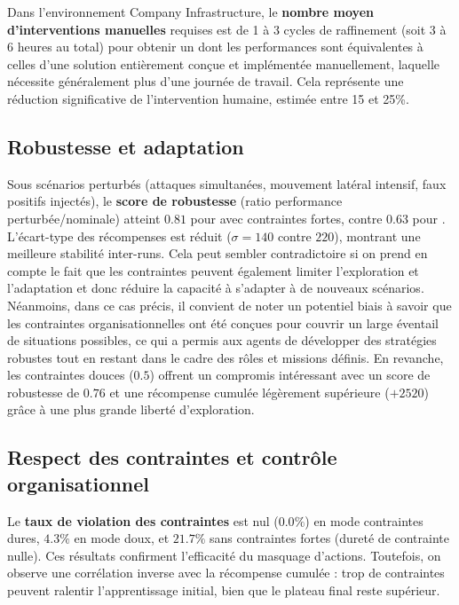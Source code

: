 Dans l'environnement Company Infrastructure, le \textbf{nombre moyen d'interventions manuelles} requises est de 1 à 3 cycles de raffinement (soit 3 à 6 heures au total) pour obtenir un  dont les performances sont équivalentes à celles d'une solution entièrement conçue et implémentée manuellement, laquelle nécessite généralement plus d'une journée de travail. Cela représente une réduction significative de l'intervention humaine, estimée entre 15 et 25\%.

\subsection*{Robustesse et adaptation}

Sous scénarios perturbés (attaques simultanées, mouvement latéral intensif, faux positifs injectés), le \textbf{score de robustesse} (ratio performance perturbée/nominale) atteint $0.81$ pour  avec contraintes fortes, contre $0.63$ pour .
L'écart-type des récompenses est réduit ($\sigma = 140$ contre $220$), montrant une meilleure stabilité inter-runs. Cela peut sembler contradictoire si on prend en compte le fait que les contraintes peuvent également limiter l'exploration et l'adaptation et donc réduire la capacité à s'adapter à de nouveaux scénarios. Néanmoins, dans ce cas précis, il convient de noter un potentiel biais à savoir que les contraintes organisationnelles ont été conçues pour couvrir un large éventail de situations possibles, ce qui a permis aux agents de développer des stratégies robustes tout en restant dans le cadre des rôles et missions définis.
En revanche, les contraintes douces ($0.5$) offrent un compromis intéressant avec un score de robustesse de $0.76$ et une récompense cumulée légèrement supérieure ($+2520$) grâce à une plus grande liberté d'exploration.

\subsection*{Respect des contraintes et contrôle organisationnel}

Le \textbf{taux de violation des contraintes} est nul ($0.0\%$) en mode contraintes dures, $4.3\%$ en mode doux, et $21.7\%$ sans contraintes fortes (dureté de contrainte nulle).
Ces résultats confirment l'efficacité du masquage d'actions.
Toutefois, on observe une corrélation inverse avec la récompense cumulée : trop de contraintes peuvent ralentir l'apprentissage initial, bien que le plateau final reste supérieur.

